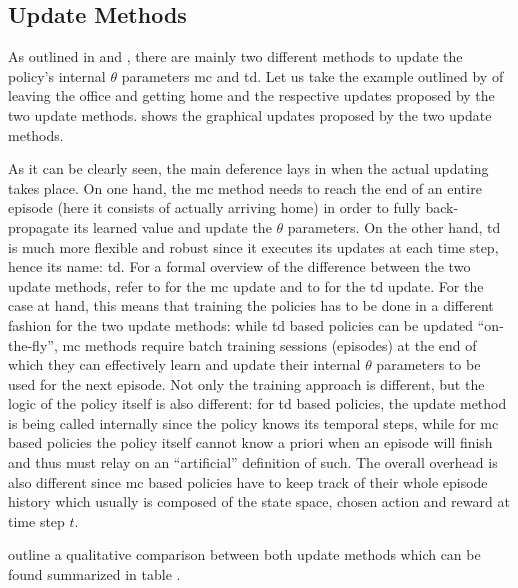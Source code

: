 \subsection{Update Methods}
\label{subsec:update_methods}

As outlined in  and , there are mainly two different methods to update the policy's internal $\theta$ parameters \ie \gls{mc} and \gls{td}. Let us take the example outlined by \citet[p. 130]{Sutton2017} of leaving the office and getting home and the respective updates proposed by the two update methods.  shows the graphical updates proposed by the two update methods.


As it can be clearly seen, the main deference lays in when the actual updating takes place. On one hand, the \gls{mc} method needs to reach the end of an entire episode (\ie here it consists of actually arriving home) in order to fully back-propagate its learned value and update the $\theta$ parameters. On the other hand, \gls{td} is much more flexible and robust since it executes its updates at each time step, hence its name: \gls{td}.
For a formal overview of the difference between the two update methods, refer to  for the \gls{mc} update and to  for the \gls{td} update.
For the case at hand, this means that training the policies has to be done in a different fashion for the two update methods: while \gls{td} based policies can be updated ``on-the-fly'', \gls{mc} methods require batch training sessions (\ie episodes) at the end of which they can effectively learn and update their internal $\theta$ parameters to be used for the next episode. Not only the training approach is different, but the logic of the policy itself is also different: for \gls{td} based policies, the update method is being called internally since the policy knows its temporal steps, while for \gls{mc} based policies the policy itself cannot know a priori when an episode will finish and thus must relay on an ``artificial'' definition of such. The overall overhead is also different since \gls{mc} based policies have to keep track of their whole episode history which usually is composed of the state space, chosen action and reward at time step $t$.

\citet{Sutton2017} outline a qualitative comparison between both update methods which can be found summarized in table .

